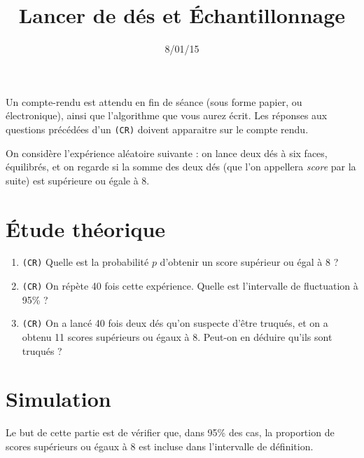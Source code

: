 \documentclass{article}
\title{Lancer de dés et Échantillonnage}
\date{8/01/15}
\newcommand\CR{\texttt{(CR)}}
\begin{document}
\maketitle

\begin{em}
  Un compte-rendu est attendu en fin de séance (sous forme papier, ou électronique), ainsi que l'algorithme que vous aurez écrit. Les réponses aux questions précédées d'un \CR{} doivent apparaitre sur le compte rendu.
\end{em}

On considère l'expérience aléatoire suivante : on lance deux dés à six faces, équilibrés, et on regarde si la somme des deux dés (que l'on appellera \emph{score} par la suite) est supérieure ou égale à 8.

\section{Étude théorique}

\begin{enumerate}
  \item \CR{} Quelle est la probabilité $p$ d'obtenir un score supérieur ou égal à 8 ?
  \item \CR{} On répète 40 fois cette expérience. Quelle est l'intervalle de fluctuation à 95\% ?
  \item \CR{} On a lancé 40 fois deux dés qu'on suspecte d'être truqués, et on a obtenu 11 scores supérieurs ou égaux à 8. Peut-on en déduire qu'ils sont truqués ?
\end{enumerate}

\pagebreak

\section{Simulation}

Le but de cette partie est de vérifier que, dans 95\% des cas, la proportion de scores supérieurs ou égaux à 8 est incluse dans l'intervalle de définition.
\end{document}

